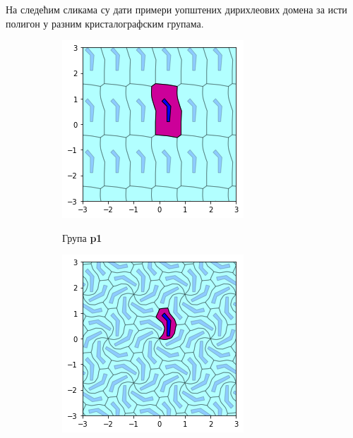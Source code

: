 \documentclass[12pt]{article}
\begin{document}
\begin{samepage}
 На следећим сликама су дати примери уопштених дирихлеових домена за исти полигон у разним кристалографским групама.
 \begin{figure}[H]

  \begin{subfigure}[b]{0.3\textwidth}
    \includegraphics[width=\textwidth]{output_21_1.png}
    \label{fig:f20}
    \caption{Група \textbf{p1}}
  \end{subfigure}
  \begin{subfigure}[b]{0.3\textwidth}
    \includegraphics[width=\textwidth]{output_21_2.png}

\end{subfigure}
\end{figure}
\end{samepage}
\end{document}
